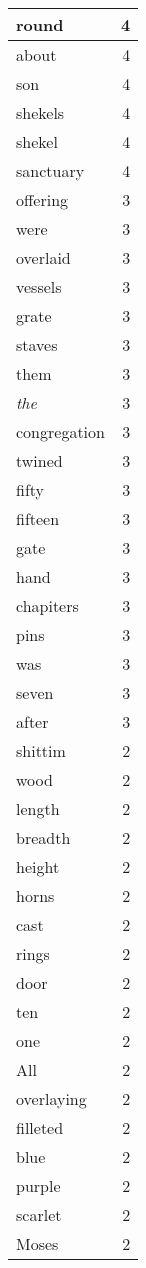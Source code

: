 \begin{center}
\begin{longtable}{l|r}
round & 4 \\ \hline
about & 4 \\ \hline
son & 4 \\ \hline
shekels & 4 \\ \hline
shekel & 4 \\ \hline
sanctuary & 4 \\ \hline
offering & 3 \\ \hline
were & 3 \\ \hline
overlaid & 3 \\ \hline
vessels & 3 \\ \hline
grate & 3 \\ \hline
staves & 3 \\ \hline
them & 3 \\ \hline
\emph{the} & 3 \\ \hline
congregation & 3 \\ \hline
twined & 3 \\ \hline
fifty & 3 \\ \hline
fifteen & 3 \\ \hline
gate & 3 \\ \hline
hand & 3 \\ \hline
chapiters & 3 \\ \hline
pins & 3 \\ \hline
was & 3 \\ \hline
seven & 3 \\ \hline
after & 3 \\ \hline
shittim & 2 \\ \hline
wood & 2 \\ \hline
length & 2 \\ \hline
breadth & 2 \\ \hline
height & 2 \\ \hline
horns & 2 \\ \hline
cast & 2 \\ \hline
rings & 2 \\ \hline
door & 2 \\ \hline
ten & 2 \\ \hline
one & 2 \\ \hline
All & 2 \\ \hline
overlaying & 2 \\ \hline
filleted & 2 \\ \hline
blue & 2 \\ \hline
purple & 2 \\ \hline
scarlet & 2 \\ \hline
Moses & 2 \\ \hline

\end{longtable}
\end{center}
